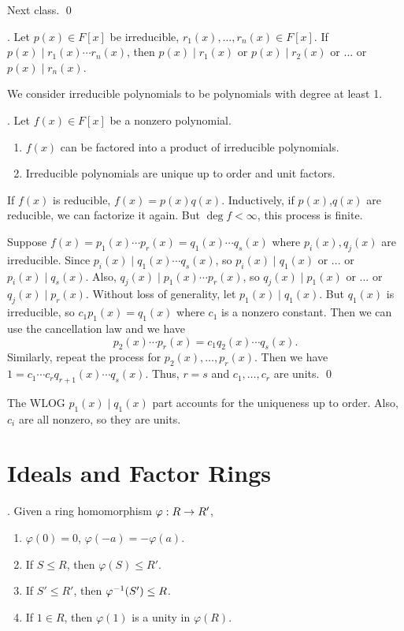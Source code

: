\pf Next class. \qed

\cor. Let \(p(x) \in F[x]\) be irreducible, \(r_1(x), \dots, r_n(x) \in F[x]\). If \(p(x) \mid r_1(x) \cdots r_n(x)\), then \(p(x) \mid r_1(x)\) or \(p(x) \mid r_2(x)\) or ... or \(p(x) \mid r_n(x)\).

We consider irreducible polynomials to be polynomials with degree at least 1.

\thm. Let \(f(x) \in F[x]\) be a nonzero polynomial.
\begin{enumerate}
    \item \(f(x)\) can be factored into a product of irreducible polynomials.
    \item Irreducible polynomials are unique up to order and unit factors.
\end{enumerate}

\pf {} If \(f(x)\) is reducible, \(f(x) = p(x)q(x)\). Inductively, if \(p(x)\),\(q(x)\) are reducible, we can factorize it again. But \(\deg f < \infty\), this process is finite.

 Suppose \(f(x) = p_1(x)\cdots p_r(x) = q_1(x)\cdots q_s(x)\) where \(p_i(x), q_j(x)\) are irreducible. Since \(p_i(x) \mid q_1(x)\cdots q_s(x)\), so \(p_i(x) \mid q_1(x)\) or ... or \(p_i(x) \mid q_s(x)\). Also, \(q_j(x) \mid p_1(x)\cdots p_r(x)\), so \(q_j(x) \mid p_1(x)\) or ... or \(q_j(x) \mid p_r(x)\). Without loss of generality, let \(p_1(x) \mid q_1(x)\). But \(q_1(x)\) is irreducible, so \(c_1 p_1(x) = q_1(x)\) where \(c_1\) is a nonzero constant. Then we can use the cancellation law and we have
\[
    p_2(x) \cdots p_r(x) = c_1 q_2(x)\cdots q_s(x).
\]
Similarly, repeat the process for \(p_2(x), \dots, p_r(x)\). Then we have \(1 = c_1\cdots c_r q_{r+1}(x)\cdots q_s(x)\). Thus, \(r = s\) and \(c_1, \dots, c_r\) are units. \qed

\rmk The WLOG \(p_1(x) \mid q_1(x)\) part accounts for the uniqueness up to order. Also, \(c_i\) are all nonzero, so they are units.

\pagebreak

\chapter{Ideals and Factor Rings}

\setcounter{topic}{25}

\thm. Given a ring homomorphism \(\varphi: R \rightarrow R'\),
\begin{enumerate}
    \item \(\varphi(0) = 0\), \(\varphi(-a) = -\varphi(a)\).
    \item If \(S \leq R\), then \(\varphi(S) \leq R'\).
    \item If \(S' \leq R'\), then \(\varphi^{-1}(S') \leq R\).
    \item If \(1 \in R\), then \(\varphi(1)\) is a unity in \(\varphi(R)\).
\end{enumerate}


